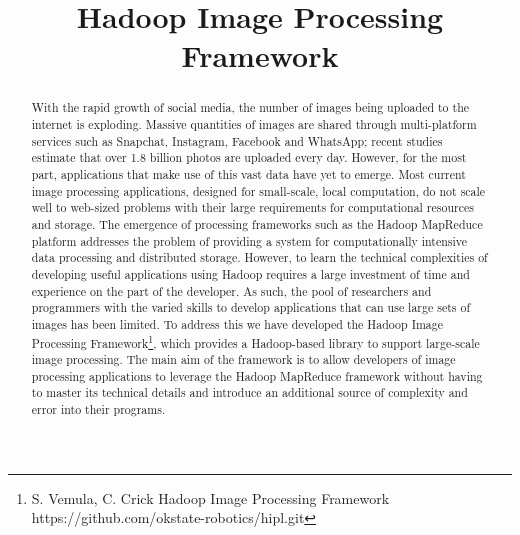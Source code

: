 \documentclass[conference]{IEEEtran}
\begin{document}
\title{Hadoop Image Processing Framework}
\author{
  \and
}
\maketitle
\begin{abstract}
With the rapid growth of social media, the number of images being
uploaded to the internet is exploding. Massive quantities of images
are shared through multi-platform services such as Snapchat,
Instagram, Facebook and WhatsApp; recent studies estimate that over
1.8 billion photos are uploaded every day.  However, for the most
part, applications that make use of this vast data have yet to
emerge. Most current image processing applications, designed for
small-scale, local computation, do not scale well to web-sized
problems with their large requirements for computational resources and
storage.  The emergence of processing frameworks such as the Hadoop
MapReduce\cite{dean2008} platform addresses the problem of providing
a system for computationally intensive data processing and distributed
storage. However, to learn the technical complexities of developing
useful applications using Hadoop requires a large investment of time
and experience on the part of the developer.  As such, the pool of
researchers and programmers with the varied skills to develop
applications that can use large sets of images has been limited. To
address this we have developed the Hadoop Image Processing Framework\footnote[1]{S. Vemula, C. Crick Hadoop Image Processing Framework https://github.com/okstate-robotics/hipl.git},
which provides a Hadoop-based library to support large-scale image
processing. The main aim of the framework is to allow developers of
image processing applications to leverage the Hadoop MapReduce
framework without having to master its technical details and introduce
an additional source of complexity and error into their programs.
\end{abstract}
	
\end{document}
